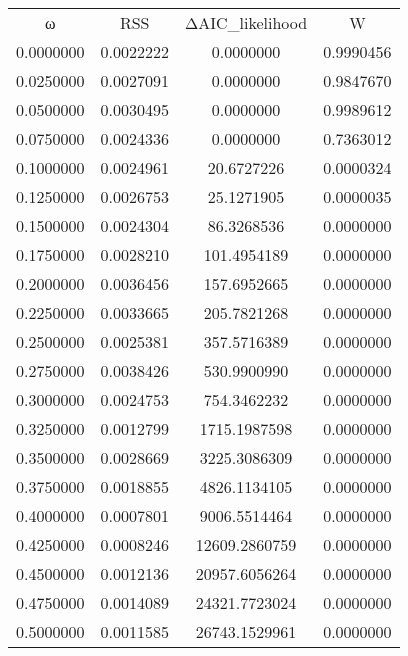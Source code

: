 \begin{tabular}{cccc}
ω & RSS & ΔAIC_likelihood & W\\
0.0000000 & 0.0022222 & 0.0000000 & 0.9990456\\
0.0250000 & 0.0027091 & 0.0000000 & 0.9847670\\
0.0500000 & 0.0030495 & 0.0000000 & 0.9989612\\
0.0750000 & 0.0024336 & 0.0000000 & 0.7363012\\
0.1000000 & 0.0024961 & 20.6727226 & 0.0000324\\
0.1250000 & 0.0026753 & 25.1271905 & 0.0000035\\
0.1500000 & 0.0024304 & 86.3268536 & 0.0000000\\
0.1750000 & 0.0028210 & 101.4954189 & 0.0000000\\
0.2000000 & 0.0036456 & 157.6952665 & 0.0000000\\
0.2250000 & 0.0033665 & 205.7821268 & 0.0000000\\
0.2500000 & 0.0025381 & 357.5716389 & 0.0000000\\
0.2750000 & 0.0038426 & 530.9900990 & 0.0000000\\
0.3000000 & 0.0024753 & 754.3462232 & 0.0000000\\
0.3250000 & 0.0012799 & 1715.1987598 & 0.0000000\\
0.3500000 & 0.0028669 & 3225.3086309 & 0.0000000\\
0.3750000 & 0.0018855 & 4826.1134105 & 0.0000000\\
0.4000000 & 0.0007801 & 9006.5514464 & 0.0000000\\
0.4250000 & 0.0008246 & 12609.2860759 & 0.0000000\\
0.4500000 & 0.0012136 & 20957.6056264 & 0.0000000\\
0.4750000 & 0.0014089 & 24321.7723024 & 0.0000000\\
0.5000000 & 0.0011585 & 26743.1529961 & 0.0000000\\
\end{tabular}

